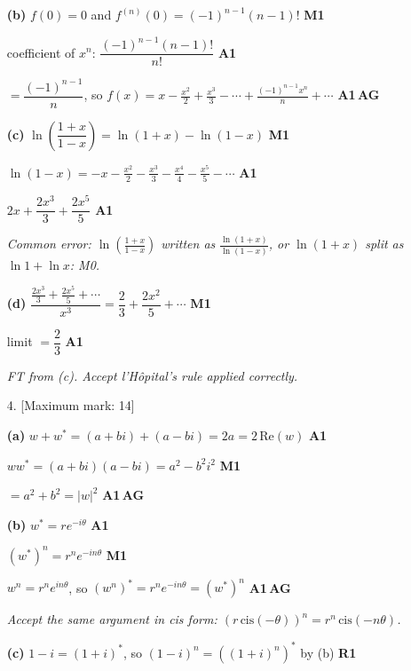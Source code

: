 \documentclass[12pt, twoside]{article}
\begin{document}
\begin{enumerate}[itemsep=0.3cm]
\textbf{(b)} $f(0) = 0$ and $f^{(n)}(0) = (-1)^{n - 1}(n - 1)!$
\hfill \textbf{M1}

coefficient of $x^{n}$: $\dfrac{(-1)^{n - 1}(n - 1)!}{n!}$ \hfill \textbf{A1}

$= \dfrac{(-1)^{n - 1}}{n}$, so
$f(x) = x - \frac{x^{2}}{2} + \frac{x^{3}}{3} - \cdots
+ \frac{(-1)^{n - 1}x^{n}}{n} + \cdots$ \hfill \textbf{A1}\,\textbf{AG}

\textbf{(c)} $\ln\left(\dfrac{1 + x}{1 - x}\right) = \ln(1 + x) - \ln(1 - x)$
\hfill \textbf{M1}

$\ln(1 - x) = -x - \frac{x^{2}}{2} - \frac{x^{3}}{3} - \frac{x^{4}}{4}
- \frac{x^{5}}{5} - \cdots$ \hfill \textbf{A1}

$2x + \dfrac{2x^{3}}{3} + \dfrac{2x^{5}}{5}$ \hfill \textbf{A1}

\emph{Common error: $\ln\left(\frac{1 + x}{1 - x}\right)$ written as
$\frac{\ln(1 + x)}{\ln(1 - x)}$, or $\ln(1 + x)$ split as
$\ln 1 + \ln x$: M0.}

\textbf{(d)} $\dfrac{\frac{2x^{3}}{3} + \frac{2x^{5}}{5} + \cdots}{x^{3}}
= \dfrac{2}{3} + \dfrac{2x^{2}}{5} + \cdots$ \hfill \textbf{M1}

limit $= \dfrac{2}{3}$ \hfill \textbf{A1}

\emph{FT from (c). Accept l'H\^opital's rule applied correctly.}

\newpage

\item[4.] [Maximum mark: 14]

\textbf{(a)} $w + w^{*} = (a + bi) + (a - bi) = 2a = 2\,\mathrm{Re}(w)$
\hfill \textbf{A1}

$ww^{*} = (a + bi)(a - bi) = a^{2} - b^{2}i^{2}$ \hfill \textbf{M1}

$= a^{2} + b^{2} = |w|^{2}$ \hfill \textbf{A1}\,\textbf{AG}

\textbf{(b)} $w^{*} = re^{-i\theta}$ \hfill \textbf{A1}

$\left(w^{*}\right)^{n} = r^{n}e^{-in\theta}$ \hfill \textbf{M1}

$w^{n} = r^{n}e^{in\theta}$, so
$\left(w^{n}\right)^{*} = r^{n}e^{-in\theta} = \left(w^{*}\right)^{n}$
\hfill \textbf{A1}\,\textbf{AG}

\emph{Accept the same argument in cis form:
$\left(r\,\mathrm{cis}(-\theta)\right)^{n} = r^{n}\,\mathrm{cis}(-n\theta)$.}

\textbf{(c)} $1 - i = (1 + i)^{*}$, so $(1 - i)^{n} = \left((1 + i)^{n}\right)^{*}$
by (b) \hfill \textbf{R1}


\end{enumerate}
\end{document}
